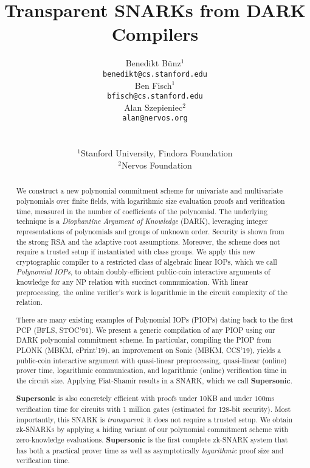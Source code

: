 \documentclass[12pt]{article}
\title{Transparent SNARKs from DARK Compilers}
\author{\begin{tabular}{c}Benedikt B\"unz$^1$ \\ \small \texttt{benedikt@cs.stanford.edu} \end{tabular}   \begin{tabular}{c}Ben Fisch$^1$ \\ \small \texttt{bfisch@cs.stanford.edu} \end{tabular}   \begin{tabular}{c}Alan Szepieniec$^2$ \\ \small \texttt{alan@nervos.org} \end{tabular} \\
\\
$^1$Stanford University, Findora Foundation \\
$^2$Nervos Foundation}
\date{}
\theoremstyle{definition}
\begin{document}
\maketitle

\begin{abstract} 
We construct a new polynomial commitment scheme for univariate and multivariate polynomials over finite fields, with logarithmic size evaluation proofs and verification time, measured in the number of coefficients of the polynomial. The underlying technique is a \emph{Diophantine Argument of Knowledge} (DARK), leveraging integer representations of polynomials and groups of unknown order. Security is shown from the strong RSA and the adaptive root assumptions. Moreover, the scheme does not require a trusted setup if instantiated with class groups. We apply this new cryptographic compiler to a restricted class of algebraic linear IOPs, which we call \emph{Polynomial IOPs}, to obtain doubly-efficient public-coin interactive arguments of knowledge for any NP relation with succinct communication. With linear preprocessing, the online verifier's work is logarithmic in the circuit complexity of the relation.

There are many existing examples of Polynomial IOPs (PIOPs) dating back to the first PCP (BFLS, STOC'91). %
We present a generic compilation of any PIOP using our DARK polynomial commitment scheme. In particular, compiling the PIOP from \textsf{PLONK} (MBKM, ePrint'19), an improvement on \textsf{Sonic} (MBKM, CCS'19), yields a public-coin interactive argument with quasi-linear preprocessing, quasi-linear (online) prover time, logarithmic communication, and logarithmic (online) verification time in the circuit size. Applying Fiat-Shamir results in a SNARK, which we call \textsf{\textbf{Supersonic}}. 

\textsf{\textbf{Supersonic}} is also concretely efficient with proofs under 10KB and under $100$ms verification time for circuits with 1 million gates (estimated for 128-bit security). Most importantly, this SNARK is \emph{transparent}: it does not require a trusted setup. We obtain zk-SNARKs by applying a hiding variant of our polynomial commitment scheme with zero-knowledge evaluations. \textsf{\textbf{Supersonic}} is the first complete zk-SNARK system that has both a practical prover time as well as asymptotically \emph{logarithmic} proof size and verification time. 


\end{abstract} 
\end{document}
